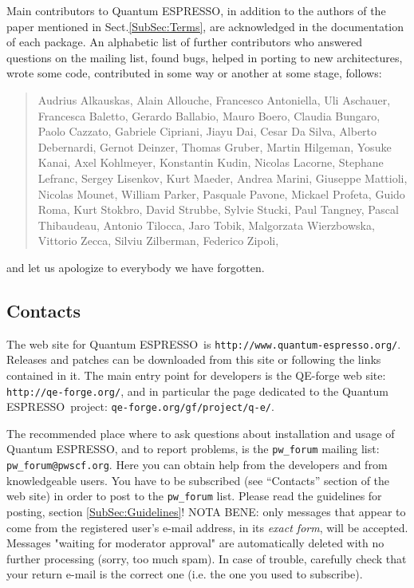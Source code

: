 \documentclass[12pt,a4paper]{article}
\def\qe{{\sc Quantum ESPRESSO}}
\begin{document}
Main contributors to \qe, in addition to the authors of the paper 
mentioned in Sect.\ref{SubSec:Terms}, are acknowledged in the 
documentation of each package. An alphabetic list of further
contributors who answered questions on the mailing list, found 
bugs, helped in porting to new architectures, wrote some code,
contributed in some way or another at some stage, follows:
\begin{quote}
  Audrius Alkauskas, Alain Allouche, Francesco Antoniella,
  Uli Aschauer,  Francesca Baletto, Gerardo Ballabio, Mauro Boero, 
  Claudia Bungaro, Paolo Cazzato, Gabriele Cipriani, Jiayu Dai,
  Cesar Da Silva, Alberto Debernardi, Gernot Deinzer, Thomas Gruber,
  Martin Hilgeman, Yosuke Kanai, Axel Kohlmeyer, Konstantin Kudin,
  Nicolas Lacorne, Stephane Lefranc, Sergey Lisenkov, Kurt Maeder,
  Andrea Marini, Giuseppe Mattioli, Nicolas Mounet, William Parker,
  Pasquale Pavone, Mickael Profeta, Guido Roma, Kurt Stokbro, 
  David Strubbe, Sylvie Stucki, Paul Tangney,  Pascal Thibaudeau, 
  Antonio Tilocca, Jaro Tobik, Malgorzata Wierzbowska, Vittorio Zecca,
  Silviu Zilberman, Federico Zipoli,
\end{quote}
and let us apologize to everybody we have forgotten.
 
\subsection{Contacts}
\label{SubSec:Contacts}

The web site for \qe\ is \texttt{http://www.quantum-espresso.org/}.
Releases and patches can be downloaded from this
site or following the links contained in it. The main entry point for 
developers is the QE-forge web site:
\texttt{http://qe-forge.org/}, and in particular the page dedicated to
the \qe\ project: \texttt{qe-forge.org/gf/project/q-e/}.

The recommended place where to ask questions about installation 
and usage of \qe, and to report problems, is the \texttt{pw\_forum} 
mailing list: \texttt{pw\_forum@pwscf.org}.
Here you can obtain help from the developers and from 
knowledgeable users. You have to be subscribed (see ``Contacts'' 
section of the web site) in order to post to the  \texttt{pw\_forum} 
list. Please read the guidelines for posting, section \ref{SubSec:Guidelines}!
NOTA BENE: only messages that appear to come from the 
registered user's e-mail address, in its {\em exact form}, will be
accepted. Messages "waiting for moderator approval" are
automatically deleted with no further processing (sorry, too 
much spam). In case of trouble, carefully check that your return 
e-mail is the correct one (i.e. the one you used to subscribe).
\end{document}
